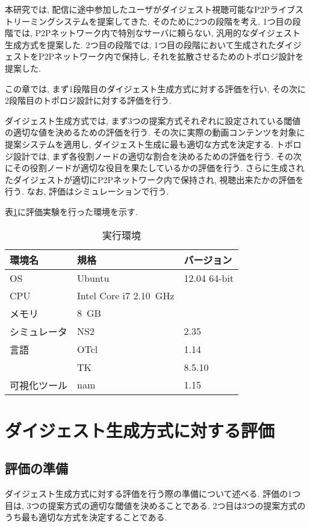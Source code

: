本研究では,  配信に途中参加したユーザがダイジェスト視聴可能なP2Pライブストリーミングシステムを提案してきた. そのために2つの段階を考え, 1つ目の段階では, P2Pネットワーク内で特別なサーバに頼らない, 汎用的なダイジェスト生成方式を提案した. 2つ目の段階では, 1つ目の段階において生成されたダイジェストをP2Pネットワーク内で保持し, それを拡散させるためのトポロジ設計を提案した.

この章では, まず1段階目のダイジェスト生成方式に対する評価を行い, その次に2段階目のトポロジ設計に対する評価を行う.

ダイジェスト生成方式では, まず3つの提案方式それぞれに設定されている閾値の適切な値を決めるための評価を行う. その次に実際の動画コンテンツを対象に提案システムを適用し, ダイジェスト生成に最も適切な方式を決定する. トポロジ設計では, まず各役割ノードの適切な割合を決めるための評価を行う. その次にその役割ノードが適切な役目を果たしているかの評価を行う. さらに生成されたダイジェストが適切にP2Pネットワーク内で保持され, 視聴出来たかの評価を行う. なお, 評価はシミュレーションで行う.

表\ref{tbl:env}に評価実験を行った環境を示す.

\begin{table}[h]
  \caption{実行環境}
  \label{tbl:env}
  \centering
      {\small
        \begin{tabular}{|l|l|l|} \hline
          環境名 & 規格 & バージョン \\ \hline \hline
          OS & Ubuntu & 12.04 64-bit  \\ \hline
          CPU & Intel Core i7 2.10~GHz & \\ \hline
          メモリ & 8~GB & \\ \hline
          シミュレータ & NS2 & 2.35 \\ \hline
          言語 & OTcl & 1.14 \\ \cline{2-3}
           & TK & 8.5.10 \\ \hline
          可視化ツール & nam & 1.15 \\ \hline
        \end{tabular}
      }
\end{table}

\section{ダイジェスト生成方式に対する評価}\label{sec:ev-digest}
\subsection{評価の準備}
ダイジェスト生成方式に対する評価を行う際の準備について述べる. 評価の1つ目は, 3つの提案方式の適切な閾値を決めることである. 2つ目は3つの提案方式のうち最も適切な方式を決定することである.

